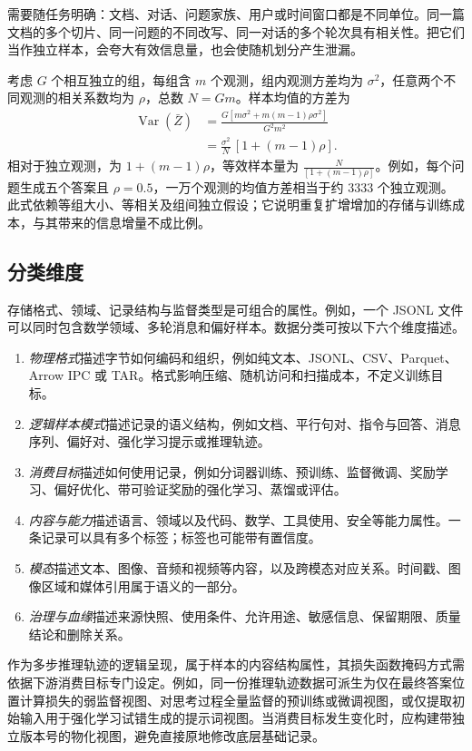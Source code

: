 \documentclass[../textbook.tex]{subfiles}
\begin{document}
需要随任务明确：文档、对话、问题家族、用户或时间窗口都是不同单位。同一篇文档的多个切片、同一问题的不同改写、同一对话的多个轮次具有相关性。把它们当作独立样本，会夸大有效信息量，也会使随机划分产生泄漏。

考虑 $G$ 个相互独立的组，每组含 $m$ 个观测，组内观测方差均为 $\sigma^2$，任意两个不同观测的相关系数均为 $\rho$，总数 $N=Gm$。样本均值的方差为
\begin{align}
\operatorname{Var}(\bar Z)
 &=\frac{G[m\sigma^2+m(m-1)\rho\sigma^2]}{G^2m^2}\\
 &=\frac{\sigma^2}{N}\,[1+(m-1)\rho].
\end{align}
相对于独立观测，为 $1+(m-1)\rho$，等效样本量为 $\frac{N}{[1+(m-1)\rho]}$。例如，每个问题生成五个答案且 $\rho=0.5$，一万个观测的均值方差相当于约 $3333$ 个独立观测。此式依赖等组大小、等相关及组间独立假设；它说明重复扩增增加的存储与训练成本，与其带来的信息增量不成比例。

\subsection{分类维度}
存储格式、领域、记录结构与监督类型是可组合的属性。例如，一个 JSONL 文件可以同时包含数学领域、多轮消息和偏好样本。数据分类可按以下六个维度描述。

\begin{enumerate}
\item \emph{物理格式}描述字节如何编码和组织，例如纯文本、JSONL、CSV、Parquet、Arrow IPC 或 TAR。格式影响压缩、随机访问和扫描成本，不定义训练目标。
\item \emph{逻辑样本模式}描述记录的语义结构，例如文档、平行句对、指令与回答、消息序列、偏好对、强化学习提示或推理轨迹。
\item \emph{消费目标}描述如何使用记录，例如分词器训练、预训练、监督微调、奖励学习、偏好优化、带可验证奖励的强化学习、蒸馏或评估。
\item \emph{内容与能力}描述语言、领域以及代码、数学、工具使用、安全等能力属性。一条记录可以具有多个标签；标签也可能带有置信度。
\item \emph{模态}描述文本、图像、音频和视频等内容，以及跨模态对应关系。时间戳、图像区域和媒体引用属于语义的一部分。
\item \emph{治理与血缘}描述来源快照、使用条件、允许用途、敏感信息、保留期限、质量结论和删除关系。
\end{enumerate}

作为多步推理轨迹的逻辑呈现，属于样本的内容结构属性，其损失函数掩码方式需依据下游消费目标专门设定。例如，同一份推理轨迹数据可派生为仅在最终答案位置计算损失的弱监督视图、对思考过程全量监督的预训练或微调视图，或仅提取初始输入用于强化学习试错生成的提示词视图。当消费目标发生变化时，应构建带独立版本号的物化视图，避免直接原地修改底层基础记录。
\end{document}
